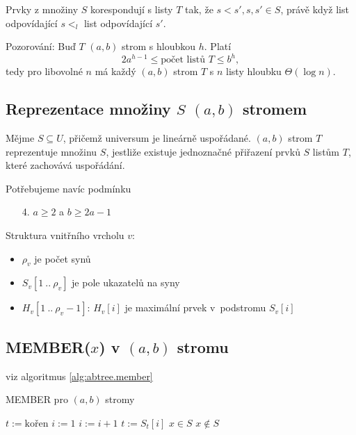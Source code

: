 \begin{pozn}
Prvky z množiny $S$ korespondují s listy $T$ tak, že $s < s', s,s' \in S$,
právě když list odpovídající $s <_l$ list odpovídající $s'$.
\end{pozn}

Pozorování: Buď $T$ $(a,b)$ strom s hloubkou $h$. Platí
\[
2 a^{h-1} \leq \text{počet listů $T$} \leq  b^h,
\]
tedy pro libovolné $n$ má každý $(a,b)$ strom $T$ s $n$ listy 
hloubku $\Theta(\log n)$.

\subsection{Reprezentace množiny $S$ $(a,b)$ stromem}

Mějme $S \subseteq U$, přičemž universum je lineárně uspořádané.
$(a,b)$ strom $T$ reprezentuje množinu $S$, jestliže existuje
jednoznačné přiřazení prvků $S$ listům $T$, které zachovává uspořádání.

Potřebujeme navíc podmínku
\begin{enumerate}
\item[4.] $a \geq 2$ a $b \geq 2a - 1$ 
\end{enumerate}

Struktura vnitřního vrcholu $v$:
\begin{itemize}
\item $\rho_v$ je počet synů
\item $S_v[1\ .. \ \rho_v]$ je pole ukazatelů na syny
\item $H_v[1\ .. \ \rho_v - 1]$: $H_v[i]$ je maximální prvek 
v~podstromu $S_v[i]$ 
\end{itemize}

\subsection{MEMBER($x$) v $(a,b)$ stromu}

viz algoritmus \ref{alg:abtree.member}

\begin{algorithm}[!htb]
\caption{MEMBER pro $(a,b)$ stromy}
\label{alg:abtree.member}
\begin{algorithmic}
\STATE {}
\STATE $t := \text{kořen}$
	\STATE $i := 1$
		\STATE $i := i + 1$
	\ENDWHILE
	\STATE $t := S_t[i]$ 
\ENDWHILE
\STATE {}
	\STATE $x \in S$
\ELSE
	\STATE $x \notin S$
\ENDIF
\end{algorithmic}
\end{algorithm}

